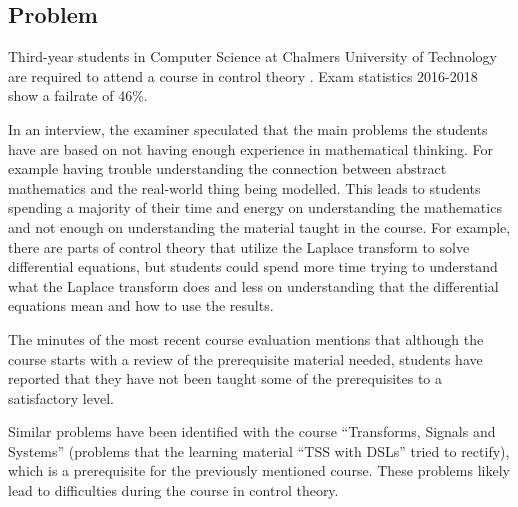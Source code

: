 \subsection{Problem}
Third-year students in Computer Science at Chalmers University of Technology are required to attend a course in control theory \cite{data_program_blad_2018}. Exam statistics 2016-2018 show a failrate of 46\%\cite{exam_stat_regler}. 

In an interview\cite{tssarbete}, the examiner speculated that the main problems the students have are based on not having enough experience in mathematical thinking. For example having trouble understanding the connection between abstract mathematics and the real-world thing being modelled.
This leads to students spending a majority of their time and energy on understanding the mathematics and not enough on understanding the material taught in the course. For example, there are parts of control theory that utilize the Laplace transform to solve differential equations, but students could spend more time trying to understand what the Laplace transform does and less on understanding that the differential equations mean and how to use the results. 

The minutes of the most recent course evaluation mentions that although the course starts with a review of the prerequisite material needed, students have reported that they have not been taught some of the prerequisites to a satisfactory level. 

Similar problems have been identified with the course ``Transforms, Signals and Systems'' (problems that the learning material ``TSS with DSLs'' \cite{tssarbete} tried to rectify), which is a prerequisite for the previously mentioned course. These problems likely lead to difficulties during the course in control theory. 
% 


